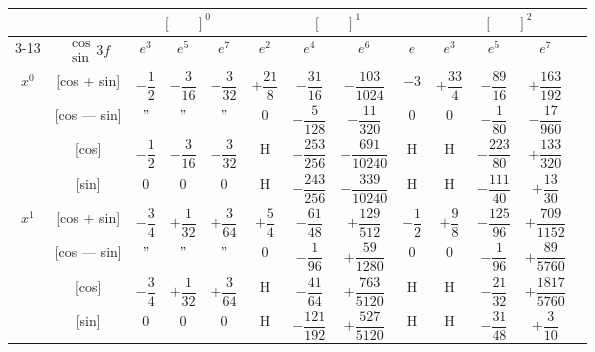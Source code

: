 \documentclass[11pt,a4paper]{book}
\begin{document}
{{\newpage


\begin{center}
\small
\begin{tabular}{|c|c|c|c|c|c|c|c|c|c|c|c|c|}
\hline
& & \multicolumn{3}{c|}{$[\phantom{()}]^0$} & \multicolumn{4}{c|}{$[\phantom{()}]^1$} & \multicolumn{4}{c|}{$[\phantom{()}]^2$} \\
\cline{3-13}
& $\begin{smallmatrix} \cos \\ \sin \end{smallmatrix} 3f$ & $e^3$ & $e^5$ & $e^7$ & $e^2$ & $e^4$ & $e^6$ & $e$ & $e^3$ & $e^5$ & $e^7$ \\
\hline
\multirow{4}{*}{$x^0$} & [cos + sin] & $-\dfrac{1}{2}$ & $-\dfrac{3}{16}$ & $-\dfrac{3}{32}$ & $+\dfrac{21}{8}$ & $-\dfrac{31}{16}$ & $-\dfrac{103}{1024}$ & $-3$ & $+\dfrac{33}{4}$ & $-\dfrac{89}{16}$ & $+\dfrac{163}{192}$ \\
& [cos --- sin] & $"$ & $"$ & $"$ & $0$ & $-\dfrac{5}{128}$ & $-\dfrac{11}{320}$ & $0$ & $0$ & $-\dfrac{1}{80}$ & $-\dfrac{17}{960}$ \\
& [cos] & $-\dfrac{1}{2}$ & $-\dfrac{3}{16}$ & $-\dfrac{3}{32}$ & H & $-\dfrac{253}{256}$ & $-\dfrac{691}{10240}$ & H & H & $-\dfrac{223}{80}$ & $+\dfrac{133}{320}$ \\
& [sin] & $0$ & $0$ & $0$ & H & $-\dfrac{243}{256}$ & $-\dfrac{339}{10240}$ & H & H & $-\dfrac{111}{40}$ & $+\dfrac{13}{30}$ \\
\hline
\multirow{4}{*}{$x^1$} & [cos + sin] & $-\dfrac{3}{4}$ & $+\dfrac{1}{32}$ & $+\dfrac{3}{64}$ & $+\dfrac{5}{4}$ & $-\dfrac{61}{48}$ & $+\dfrac{129}{512}$ & $-\dfrac{1}{2}$ & $+\dfrac{9}{8}$ & $-\dfrac{125}{96}$ & $+\dfrac{709}{1152}$ \\
& [cos --- sin] & $"$ & $"$ & $"$ & $0$ & $-\dfrac{1}{96}$ & $+\dfrac{59}{1280}$ & $0$ & $0$ & $-\dfrac{1}{96}$ & $+\dfrac{89}{5760}$ \\
& [cos] & $-\dfrac{3}{4}$ & $+\dfrac{1}{32}$ & $+\dfrac{3}{64}$ & H & $-\dfrac{41}{64}$ & $+\dfrac{763}{5120}$ & H & H & $-\dfrac{21}{32}$ & $+\dfrac{1817}{5760}$ \\
& [sin] & $0$ & $0$ & $0$ & H & $-\dfrac{121}{192}$ & $+\dfrac{527}{5120}$ & H & H & $-\dfrac{31}{48}$ & $+\dfrac{3}{10}$ \\

\end{tabular}
\end{center}}}
\end{document}
